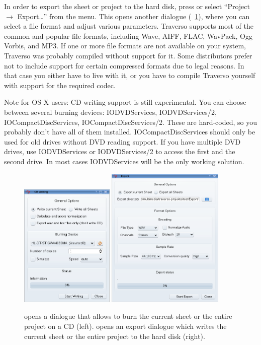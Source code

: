 In order to export the sheet or project to the hard disk, press  or select ``Project $\rightarrow$ Export\dots'' from the menu. This opens another dialogue (\FigB~\ref{fig_exportdlg}), where you can select a file format and adjust various parameters. Traverso supports most of the common and popular file formats, including Wave, AIFF, FLAC, WavPack, Ogg Vorbis, and MP3. If one or more file formats are not available on your system, Traverso was probably compiled without support for it. Some distributors prefer not to include support for certain compressed formats due to legal reasons. In that case you either have to live with it, or you have to compile Traverso yourself with support for the required codec.

Note for OS X users: CD writing support is still experimental. You can choose between several burning devices: IODVDServices, IODVDServices/2, IOCompactDiscServices, IOCompactDiscServices/2. These are hard-coded, so you probably don't have all of them installed. IOCompactDiscServices should only be used for old drives without DVD reading support. If you have multiple DVD drives, use IODVDServices or IODVDServices/2 to access the first and the second drive. In most cases IODVDServices will be the only working solution.

\begin{figure}[t]
 \centering
 \includegraphics[width=0.4\textwidth]{../images/exportdlg}\qquad
 \includegraphics[width=0.5\textwidth]{../images/exportdlg1}
 \caption{ opens a dialogue that allows to burn the current sheet or the entire project on a CD (left).  opens an export dialogue which writes the current sheet or the entire project to the hard disk (right).}
 \label{fig_exportdlg}
\end{figure}

